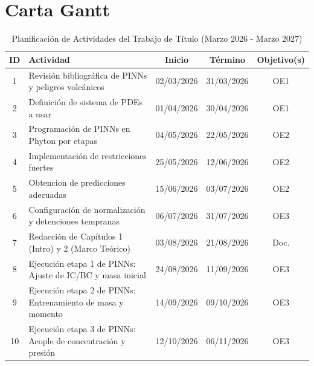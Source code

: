 \documentclass[11pt]{article}
\begin{document}
\section{Carta Gantt}
\begin{table}[htbp]
\centering
\caption{Planificación de Actividades del Trabajo de Título (Marzo 2026 - Marzo 2027)}
\label{tab:planificacion_gantt}
\renewcommand{\arraystretch}{1.3} %
\begin{tabular}{|c|p{7cm}|c|c|c|}
\hline
\textbf{ID} & \textbf{Actividad} & \textbf{Inicio} & \textbf{Término} & \textbf{Objetivo(s)} \\ \hline
1 & Revisión bibliográfica de PINNs y peligros volcánicos & 02/03/2026 & 31/03/2026 & OE1 \\ \hline
2 & Definición de sistema de PDEs a usar& 01/04/2026 & 30/04/2026 & OE1 \\ \hline
3 & Programación de PINNs en Phyton por etapas & 04/05/2026 & 22/05/2026 & OE2 \\ \hline
4 & Implementación de restricciones fuertes & 25/05/2026 & 12/06/2026 & OE2 \\ \hline
5 & Obtencion de predicciones adecuadas & 15/06/2026 & 03/07/2026 & OE2 \\ \hline
6 & Configuración de normalización y detenciones tempranas & 06/07/2026 & 31/07/2026 & OE3 \\ \hline
7 & Redacción de Capítulos 1 (Intro) y 2 (Marco Teórico) & 03/08/2026 & 21/08/2026 & Doc. \\ \hline
8 & Ejecución etapa 1 de PINNs: Ajuste de IC/BC y masa inicial & 24/08/2026 & 11/09/2026 & OE3 \\ \hline
9 & Ejecución etapa 2 de PINNs: Entrenamiento de masa y momento & 14/09/2026 & 09/10/2026 & OE3 \\ \hline
10 & Ejecución etapa 3 de PINNs: Acople de concentración y presión & 12/10/2026 & 06/11/2026 & OE3 \\ \hline
\end{tabular}
\end{table}
\clearpage
\end{document}
